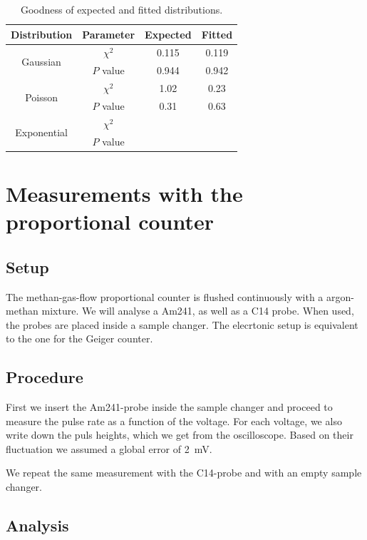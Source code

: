 \begin{table}[H]
	\renewcommand{\arraystretch}{1.5}
	\centering
	\begin{tabular}{|c|c|c|c|}
		\hline
		Distribution & Parameter & Expected & Fitted \\
		\hline
		\multirow{2}{*}{Gaussian} & $\chi^2$ & \SI{0.115}{} & \SI{0.119}{} \\
		 & $P$ value & \SI{0.944}{} & \SI{0.942}{} \\
		\hline
		\multirow{2}{*}{Poisson} & $\chi^2$ & \SI{1.02}{} & \SI{0.23}{} \\
		 & $P$ value & \SI{0.31}{} & \SI{0.63}{} \\
		\hline
		\multirow{2}{*}{Exponential} & $\chi^2$ & \SI{}{} & \SI{}{} \\
		 & $P$ value & \SI{}{} & \SI{}{} \\
		\hline
	\end{tabular}
	\caption{Goodness of expected and fitted distributions.}
	\label{tab:DistGood}
\end{table}

\section{Measurements with the proportional counter}

\subsection{Setup}

The methan-gas-flow proportional counter is flushed continuously with a argon-methan mixture. We will analyse a Am241, as well as a C14 probe. When used, the probes are placed inside a sample changer. The elecrtonic setup is equivalent to the one for the Geiger counter.

\subsection{Procedure}

First we insert the Am241-probe inside the sample changer and proceed to measure the pulse rate as a function of the voltage. For each voltage, we also write down the puls heights, which we get from the oscilloscope. Based on their fluctuation we assumed a global error of \SI{2}{mV}.

We repeat the same measurement with the C14-probe and with an empty sample changer.

\subsection{Analysis}

